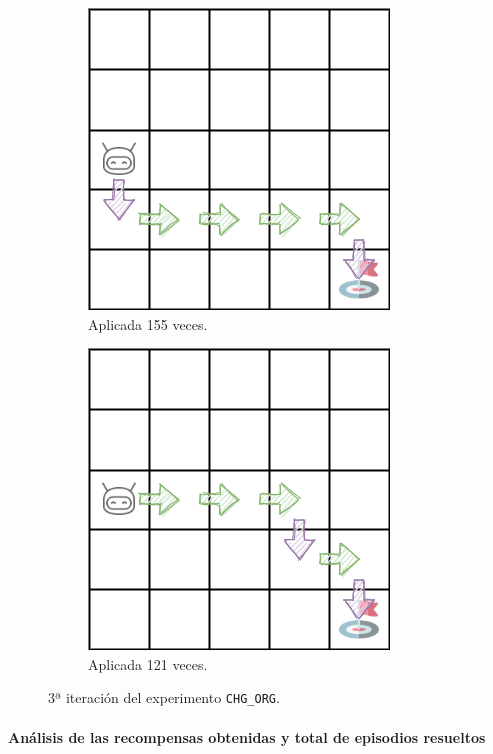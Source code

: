 \begin{figure}
    \centering
    \begin{subfigure}{.5\textwidth}
        \centering
        \includegraphics[scale=0.4]{cap5_experimentacion/images/dim5_CHANGE_ORIGIN-20-09_00-42-50_155.png}
        \caption{Aplicada 155 veces.}
        \label{fig:dim5_CHANGE_ORIGIN-20-09_00-42-50_155}
    \end{subfigure}%
    \begin{subfigure}{.5\textwidth}
        \centering
        \includegraphics[scale=0.4]{cap5_experimentacion/images/dim5_CHANGE_ORIGIN-20-09_00-42-50_121.png}
        \caption{Aplicada 121 veces.}
        \label{fig:dim5_CHANGE_ORIGIN-20-09_00-42-50_121}
    \end{subfigure}
    \caption{3ª iteración del experimento \texttt{CHG\_ORG}.}
    \label{fig:dim5_CHANGE_ORIGIN-20-09_00-42-50_3iter}
\end{figure}

\paragraph{Análisis de las recompensas obtenidas y total de episodios resueltos} 

